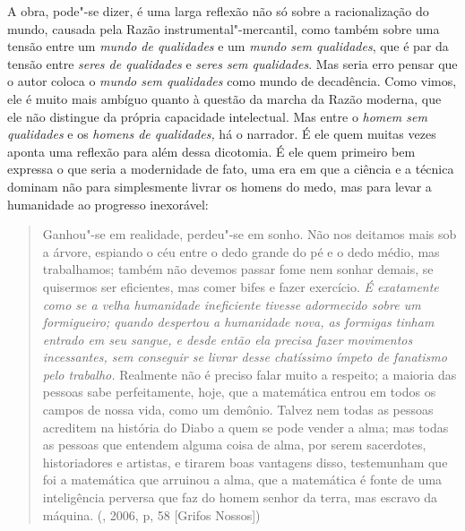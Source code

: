 A obra, pode"-se dizer, é uma larga reflexão não só sobre a
racionalização do mundo, causada pela Razão instrumental"-mercantil, como
também sobre uma tensão entre um \emph{mundo de qualidades} e um
\emph{mundo sem qualidades}, que é par da tensão entre \emph{seres de
qualidades} e \emph{seres sem qualidades}. Mas seria erro pensar que o
autor coloca o \emph{mundo sem qualidades} como mundo de decadência.
Como vimos, ele é muito mais ambíguo quanto à questão da marcha da Razão
moderna, que ele não distingue da própria capacidade intelectual. Mas
entre o \emph{homem sem qualidades} e os \emph{homens de qualidades,} há
o narrador. É ele quem muitas vezes aponta uma reflexão para além dessa
dicotomia. É ele quem primeiro bem expressa o que seria a modernidade de
fato, uma era em que a ciência e a técnica dominam não para simplesmente
livrar os homens do medo, mas para levar a humanidade ao progresso
inexorável:

\begin{quote}
Ganhou"-se em realidade, perdeu"-se em sonho. Não nos deitamos mais sob a
árvore, espiando o céu entre o dedo grande do pé e o dedo médio, mas
trabalhamos; também não devemos passar fome nem sonhar demais, se
quisermos ser eficientes, mas comer bifes e fazer exercício. \emph{É
exatamente como se a velha humanidade ineficiente tivesse adormecido
sobre um formigueiro; quando despertou a humanidade nova, as formigas
tinham entrado em seu sangue, e desde então ela precisa fazer movimentos
incessantes, sem conseguir se livrar desse chatíssimo ímpeto de
fanatismo pelo trabalho.} Realmente não é preciso falar muito a
respeito; a maioria das pessoas sabe perfeitamente, hoje, que a
matemática entrou em todos os campos de nossa vida, como um demônio.
Talvez nem todas as pessoas acreditem na história do Diabo a quem se
pode vender a alma; mas todas as pessoas que entendem alguma coisa de
alma, por serem sacerdotes, historiadores e artistas, e tirarem boas
vantagens disso, testemunham que foi a matemática que arruinou a alma,
que a matemática é fonte de uma inteligência perversa que faz do homem
senhor da terra, mas escravo da máquina. (, 2006, p, 58 [Grifos
Nossos])
\end{quote}

